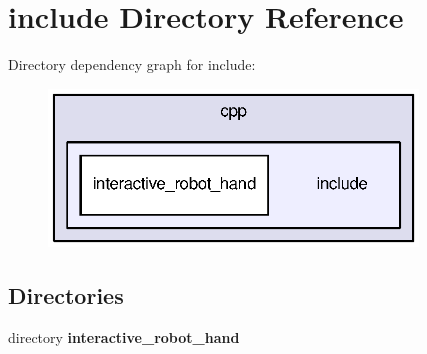 \section{include Directory Reference}
\label{dir_c21fb3a7994e371ac1cbff92d428130d}
Directory dependency graph for include\-:\nopagebreak
\begin{figure}[H]
\begin{center}
\leavevmode
\includegraphics[width=278pt]{dir_c21fb3a7994e371ac1cbff92d428130d_dep}
\end{center}
\end{figure}
\subsection*{Directories}
\begin{DoxyCompactItemize}
\item 
directory {\bf interactive\-\_\-robot\-\_\-hand}
\end{DoxyCompactItemize}
